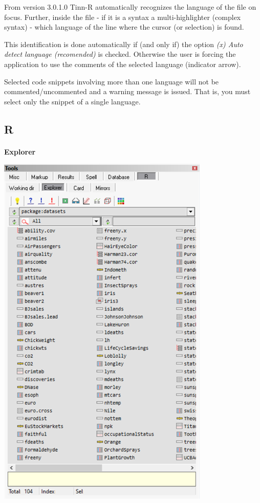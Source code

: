From version 3.0.1.0 Tinn-R automatically recognizes the
language of the file on focus. Further, inside the file
- if it is a syntax a multi-highlighter (complex syntax) - which language of
the line where the cursor (or selection) is found.

This identification is done automatically if (and only if) the option
\textit{(x) Auto detect language (recomended)} is checked. Otherwise
the user is forcing the application to use the comments of the selected language
(indicator arrow).

Selected code snippets involving more than one language will not be commented/uncommented
and a warning message is issued. That is, you must select only the snippet of a single language.

\newpage
\subsection{R}

\paragraph{}\textbf{Explorer}\\

\includegraphics[scale=0.8]{./res/tools_r_explorer.png} \\

